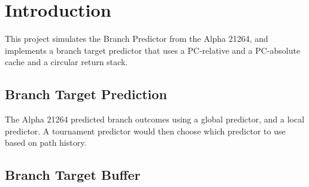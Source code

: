 \section{Introduction}
This project simulates the Branch Predictor from the Alpha 21264, and implements a branch target predictor that uses a PC-relative and a PC-absolute cache and a circular return stack.

\subsection{Branch Target Prediction}
The Alpha 21264 predicted branch outcomes using a global predictor, and a local predictor. A tournament predictor would then choose which predictor to use based on path history.

\subsection{Branch Target Buffer}
